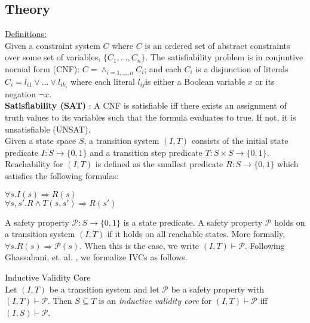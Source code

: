 \subsection{Theory}
\underline{Definitions:} \\

Given a constraint system $C$ where $C$ is an ordered set of abstract constraints over some set of variables, $\{C_1, ..., C_n\}$. The satisfiability problem is in conjuntive normal form (CNF): $C = \land_{i=1,...,n} C_i$; and each $C_i$ is a disjunction of literals $C_i = l_{i1} \lor ... \lor l_{ik_i}$ where each literal $ l_{ij}$is either a Boolean variable $x$ or its negation $\neg x$. \\

\textbf{Satisfiability (SAT)} : A CNF is satisfiable iff there exists an assignment of truth values to its variables such that the formula evaluates to true. If not, it is unsatisfiable (UNSAT). \\

Given a state space $S$, a transition system $(I,T)$ consists of the initial state predicate $I : S \rightarrow \{0,1\}$ and a transition step predicate $T : S \times S \rightarrow \{0,1\}$. Reachability for $(I,T)$ is defined as the smallest predicate $R : S \rightarrow \{0,1\}$ which satisfies the following formulas:
\begin{center}
$\forall s. I(s) \Rightarrow R(s)$\\
$\forall s, s' .  R \land T(s,s') \Rightarrow R(s')$\\
\end{center}
A safety property $\mathcal{P} : S \to \{0,1\}$ is a state predicate. A safety property $\mathcal{P}$ holds on a transition system $(I,T)$ if it holds on all reachable states. More formally, $\forall s . R(s) \Rightarrow \mathcal{P}(s)$. When this is the case, we write $(I,T) \vdash\mathcal{P}$. Following Ghassabani, et. al. \cite{DBLP:journals/corr/GhassabaniGW16}, we formalize IVCs as follows.\\

\begin{definition}Inductive Validity Core\\
 Let $(I,T)$ be a transition system and let $\mathcal{P}$ be a safety property with $(I,T) \vdash \mathcal{P}$. Then $S \subseteq T$ is an \textit{inductive validity core} for $(I,T) \vdash \mathcal{P}$ iff $(I,S) \vdash\mathcal{P}$.  \\
\end{definition}

